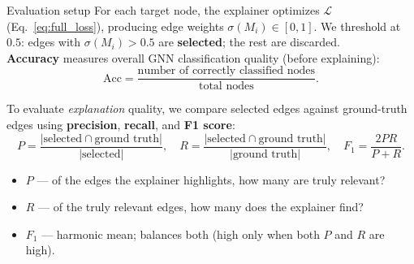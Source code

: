 \documentclass[xcolor=svgnames,aspectratio=169]{beamer}
\begin{document}
\begin{frame}{Evaluation setup}
    For each target node, the explainer optimizes $\mathcal{L}$ (Eq.~\ref{eq:full_loss}), producing edge weights $\sigma(M_i) \in [0,1]$.
    We threshold at $0.5$: edges with $\sigma(M_i) > 0.5$ are \textbf{selected}; the rest are discarded.\\[4pt]

    \textbf{Accuracy} measures overall GNN classification quality (before explaining):
    \begin{equation}
        \mathrm{Acc} = \frac{\text{number of correctly classified nodes}}{\text{total nodes}}.
    \end{equation}

    To evaluate \emph{explanation} quality, we compare selected edges against ground-truth edges using \textbf{precision}, \textbf{recall}, and \textbf{F1 score}:
    \begin{equation}
        P = \frac{|\text{selected} \cap \text{ground truth}|}{|\text{selected}|}, \quad
        R = \frac{|\text{selected} \cap \text{ground truth}|}{|\text{ground truth}|}, \quad
        F_1 = \frac{2PR}{P+R}.
    \end{equation}
    \begin{itemize}
        \item $P$ --- of the edges the explainer highlights, how many are truly relevant?
        \item $R$ --- of the truly relevant edges, how many does the explainer find?
        \item $F_1$ --- harmonic mean; balances both (high only when both $P$ and $R$ are high).
    \end{itemize}
\end{frame}
\end{document}
